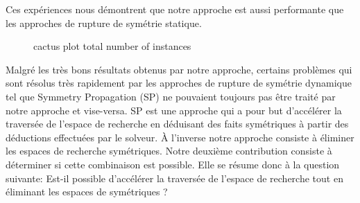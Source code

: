 Ces expériences nous démontrent que notre approche est aussi performante que les approches de rupture de symétrie statique.
\begin{figure}[!htbp]
	\centering
	\qquad
	\caption{cactus plot  total number of instances}%
	\label{fig:frcactus}%
\end{figure}

Malgré les très bons résultats obtenus par notre approche, certains problèmes qui sont résolus très 
rapidement par les approches de rupture de symétrie dynamique tel que  Symmetry Propagation (SP) ne pouvaient toujours pas être traité par notre approche et vise-versa.
SP est une approche qui a pour but d'accélérer la traversée de l'espace de recherche en déduisant des faits symétriques à partir des déductions effectuées par le solveur.
À l'inverse notre approche consiste à éliminer les espaces de recherche 
symétriques. %
Notre deuxième contribution consiste à déterminer si cette combinaison est possible. Elle se résume donc à la question suivante:
Est-il possible d'accélérer la traversée de l'espace de recherche tout en éliminant les espaces de symétriques ?

